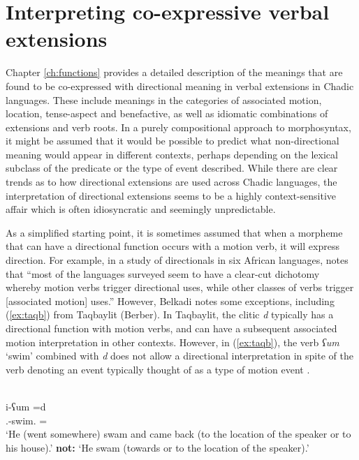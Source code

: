 \chapter{Interpreting co-expressive verbal extensions} \label{ch:interpretation}

Chapter \ref{ch:functions} provides a detailed description of the meanings that are found to be co-expressed with directional meaning in verbal extensions in Chadic languages. These include meanings in the categories of associated motion, location, tense-aspect and benefactive, as well as idiomatic combinations of extensions and verb roots. In a purely compositional approach to morphosyntax, it might be assumed that it would be possible to predict what non-directional meaning would appear in different contexts, perhaps depending on the lexical subclass of the predicate or the type of event described. While there are clear trends as to how directional extensions are used across Chadic languages, the interpretation of directional extensions seems to be a highly context-sensitive affair which is often idiosyncratic and seemingly unpredictable. 

As a simplified starting point, it is sometimes assumed that when a morpheme that can have a directional function occurs with a motion verb, it will express direction. For example, in a study of directionals in six African languages,  \citet[62]{belkadiAssociatedMotionDeictic2015} notes that ``most of the languages surveyed seem to have a clear-cut dichotomy whereby motion verbs trigger directional uses, while other classes of verbs trigger [associated motion] uses.'' However, Belkadi notes some exceptions, including (\ref{ex:taqb}) from Taqbaylit (Berber). In Taqbaylit, the clitic \textit{d} typically has a directional function with motion verbs, and can have a subsequent associated motion interpretation in other contexts. However, in (\ref{ex:taqb}), the verb \textit{ʕum} `swim' combined with \textit{d} does not allow a directional interpretation in spite of the verb denoting an event typically thought of as a type of motion event \citep[see also][]{belkadiDeicticDirectionalitySpace2015}. 

\ea\label{ex:taqb}
 \\
\gll i-ʕum =d \\
.-swim. = \\
\glt `He (went somewhere) swam and came back (to the location of the speaker or to his house).' \newline
\textbf{not:} `He swam (towards or to the location of the speaker).'
\z

